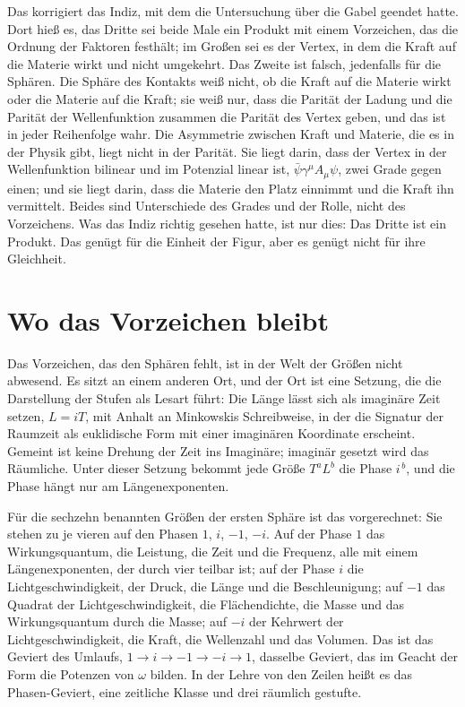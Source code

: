 \documentclass[11pt,a4paper]{article}
\begin{document}
Das korrigiert das Indiz, mit dem die Untersuchung über die Gabel geendet hatte. Dort hieß es, das Dritte sei beide Male ein Produkt mit einem Vorzeichen, das die Ordnung der Faktoren festhält; im Großen sei es der Vertex, in dem die Kraft auf die Materie wirkt und nicht umgekehrt. Das Zweite ist falsch, jedenfalls für die Sphären. Die Sphäre des Kontakts weiß nicht, ob die Kraft auf die Materie wirkt oder die Materie auf die Kraft; sie weiß nur, dass die Parität der Ladung und die Parität der Wellenfunktion zusammen die Parität des Vertex geben, und das ist in jeder Reihenfolge wahr. Die Asymmetrie zwischen Kraft und Materie, die es in der Physik gibt, liegt nicht in der Parität. Sie liegt darin, dass der Vertex in der Wellenfunktion bilinear und im Potenzial linear ist, $\bar\psi\gamma^\mu A_\mu\psi$, zwei Grade gegen einen; und sie liegt darin, dass die Materie den Platz einnimmt und die Kraft ihn vermittelt. Beides sind Unterschiede des Grades und der Rolle, nicht des Vorzeichens. Was das Indiz richtig gesehen hatte, ist nur dies: Das Dritte ist ein Produkt. Das genügt für die Einheit der Figur, aber es genügt nicht für ihre Gleichheit.

\section{Wo das Vorzeichen bleibt}
\label{sec:phasen}

Das Vorzeichen, das den Sphären fehlt, ist in der Welt der Größen nicht abwesend. Es sitzt an einem anderen Ort, und der Ort ist eine Setzung, die die Darstellung der Stufen als Lesart führt: Die Länge lässt sich als imaginäre Zeit setzen, $L=iT$, mit Anhalt an Minkowskis Schreibweise, in der die Signatur der Raumzeit als euklidische Form mit einer imaginären Koordinate erscheint. Gemeint ist keine Drehung der Zeit ins Imaginäre; imaginär gesetzt wird das Räumliche. Unter dieser Setzung bekommt jede Größe $T^aL^b$ die Phase $i^{\,b}$, und die Phase hängt nur am Längenexponenten.

Für die sechzehn benannten Größen der ersten Sphäre ist das vorgerechnet: Sie stehen zu je vieren auf den Phasen $1$, $i$, $-1$, $-i$. Auf der Phase $1$ das Wirkungsquantum, die Leistung, die Zeit und die Frequenz, alle mit einem Längenexponenten, der durch vier teilbar ist; auf der Phase $i$ die Lichtgeschwindigkeit, der Druck, die Länge und die Beschleunigung; auf $-1$ das Quadrat der Lichtgeschwindigkeit, die Flächendichte, die Masse und das Wirkungsquantum durch die Masse; auf $-i$ der Kehrwert der Lichtgeschwindigkeit, die Kraft, die Wellenzahl und das Volumen. Das ist das Geviert des Umlaufs, $1\to i\to-1\to-i\to1$, dasselbe Geviert, das im Geacht der Form die Potenzen von $\omega$ bilden. In der Lehre von den Zeilen heißt es das Phasen-Geviert, eine zeitliche Klasse und drei räumlich gestufte.
\end{document}
